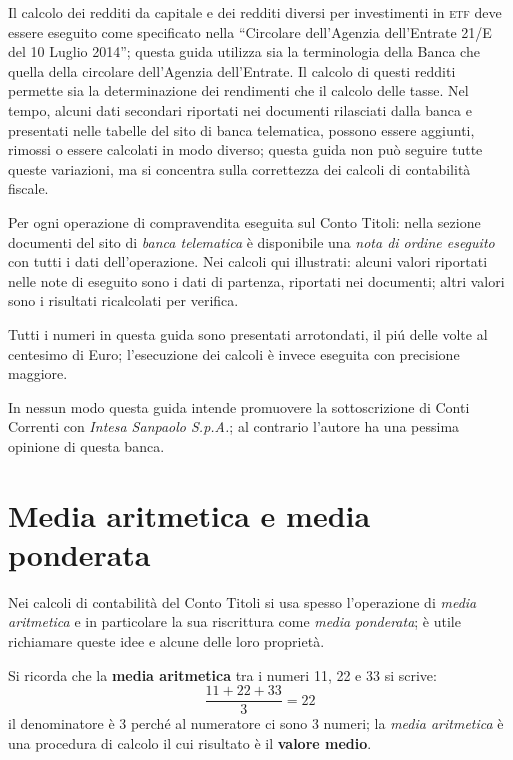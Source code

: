 \documentclass[12pt,a4paper]{article}
\newcommand{\IntesaSanpaolo}[0]{\emph{Intesa Sanpaolo S.p.A.}}
\newcommand{\Etf}[1]{\textsc{etf}}
\begin{document}
Il calcolo  dei redditi da  capitale e dei  redditi diversi per  investimenti in \Etf{}  deve essere
eseguito come  specificato nella ``Circolare  dell'Agenzia dell'Entrate  21/E del 10  Luglio 2014'';
questa  guida utilizza  sia la  terminologia  della Banca  che quella  della circolare  dell'Agenzia
dell'Entrate.  Il  calcolo di questi  redditi permette sia la  determinazione dei rendimenti  che il
calcolo delle  tasse.  Nel  tempo, alcuni  dati secondari riportati  nei documenti  rilasciati dalla
banca e presentati  nelle tabelle del sito  di banca telematica, possono essere  aggiunti, rimossi o
essere  calcolati in  modo diverso;  questa guida  non può  seguire tutte  queste variazioni,  ma si
concentra sulla correttezza dei calcoli di contabilità fiscale.

Per ogni operazione di compravendita eseguita sul  Conto Titoli: nella sezione documenti del sito di
\emph{banca  telematica}  è  disponibile  una  \emph{nota  di ordine  eseguito}  con  tutti  i  dati
dell'operazione.  Nei calcoli qui illustrati: alcuni valori  riportati nelle note di eseguito sono i
dati di partenza, riportati nei documenti; altri valori sono i risultati ricalcolati per verifica.

Tutti i numeri in questa guida sono presentati arrotondati, il piú delle volte al centesimo di Euro;
l'esecuzione dei calcoli è invece eseguita con precisione maggiore.

In  nessun  modo   questa  guida  intende  promuovere  la  sottoscrizione   di  Conti  Correnti  con
\IntesaSanpaolo{}; al contrario l'autore ha una pessima opinione di questa banca.


\section{Media aritmetica e media ponderata}


Nei calcoli di contabilità del Conto Titoli  si usa spesso l'operazione di \emph{media aritmetica} e
in particolare  la sua  riscrittura come \emph{media  ponderata}; è utile  richiamare queste  idee e
alcune delle loro proprietà.

Si ricorda che la \textbf{media aritmetica} tra i numeri \num{11}, \num{22} e \num{33} si scrive:
\begin{equation*}
  \frac{\num{11} + \num{22} + \num{33}}{3} = \num{22}
\end{equation*}
il denominatore è \num{3} perché al numeratore  ci sono \num{3} numeri; la \emph{media aritmetica} è
una procedura di calcolo il cui risultato è il \textbf{valore medio}.
\end{document}
